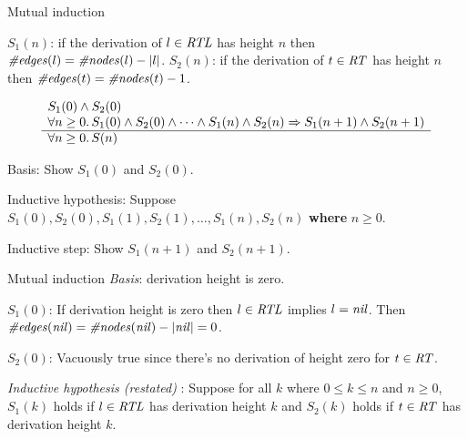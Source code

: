 \documentclass[style=sailor,size=12pt]{powerdot}
\begin{document}
\begin{wideslide}[bm=,toc=]{Mutual induction}

\vspace{1em}
$S_1(n)$: if the derivation of $l\in \mbox{\it RTL\/}$ has height $n$ then
$\mbox{\it \#edges\/}(l) = \mbox{\it \#nodes\/}(l) - |l|$.
$S_2(n)$: if the derivation of $t\in \mbox{\it RT\/}$ has height $n$ then
$\mbox{\it \#edges\/}(t) = \mbox{\it \#nodes\/}(t) - 1$.

\vspace{1em}



\begin{displaymath}
\begin{array}[t]{l}
S_1(0)\wedge S_2(0) \\
\forall n\geq 0.\, S_1(0)\wedge S_2(0) \wedge \cdots \wedge
S_1(n)\wedge S_2(n)\Rightarrow S_1(n+1)\wedge S_2(n+1)\\
\hline
\forall n\geq 0.\, S(n)
\end{array}
\end{displaymath}

\vspace{1em}
Basis: Show $S_1(0)$ and $S_2(0)$.

\vspace{1em}
Inductive hypothesis: Suppose $S_1(0), S_2(0), S_1(1), S_2(1), \ldots ,S_1(n),S_2(n)$ {\bf where} $n\geq 0$.

\vspace{1em}
Inductive step: Show $S_1(n+1)$ and $S_2(n+1)$.

\end{wideslide}
\begin{wideslide}[bm=,toc=]{Mutual induction}
{\em Basis\/}: derivation height is zero.

\vspace{1em}
$S_1(0)$: If derivation height is zero then $l\in\mbox{\it RTL\/}$ implies $l=\mbox{\it nil\/}$.
Then $\mbox{\it \#edges\/}(\mbox{\it nil\/})=\mbox{\it \#nodes\/}(\mbox{\it nil\/}) - |\mbox{\it nil\/}| = 0$.

\vspace{1em}
$S_2(0)$: Vacuously true since there's no derivation of height zero for $t\in\mbox{\it RT\/}$.

\vspace{2em}
{\em Inductive hypothesis (restated)\/} :  Suppose for all $k$ where $0\leq k\leq n$ and $n\geq 0$,
$S_1(k)$ holds if $l\in\mbox{\it RTL\/}$ has derivation height $k$ and
$S_2(k)$ holds if $t\in\mbox{\it RT\/}$ has derivation height $k$.
\end{wideslide}
\end{document}
